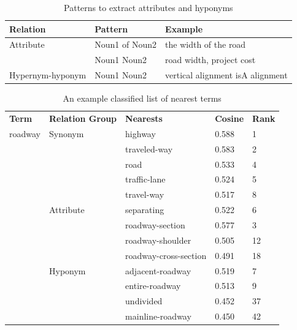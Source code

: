 \documentclass[Journal, BackFigs,NoLists, DoubleSpace]{ascelike}%
\begin{document}
%
\begin{table} [t]
	\caption{Patterns to extract attributes and hyponyms}
	\label{table:attribute_pattern}
	\centering
	\small
	\renewcommand{\arraystretch}{1.25}
	\begin{tabular}{l l l}
		\hline
		\textbf{Relation} & \textbf{Pattern} & \textbf{Example}\\
		\hline
		Attribute &	Noun1 of Noun2 & the width of the road\\
		& Noun1 Noun2	&	road width, project cost\\
		Hypernym-hyponym & Noun1 Noun2 & vertical alignment isA alignment\\
		\hline
	\end{tabular}
	\normalsize
\end{table}
%
\begin{table} [t]
	\caption{An example classified list of nearest terms}
	\label{table:term_clustering}
	\centering
	\small
	\renewcommand{\arraystretch}{1.25}
	\begin{tabular}{l l l l l}
		\hline
		\textbf{Term}	&\textbf{Relation Group}	& \textbf{Nearests} & \textbf{Cosine} & \textbf{Rank}\\
		roadway			&Synonym					& highway & 0.588 & 1\\
		&							& traveled-way & 0.583 & 2\\
		&							& road & 0.533 & 4\\						
		&							& traffic-lane & 0.524 &5\\ 						
		&							& travel-way & 0.517 & 8\\  \cmidrule{2-5}
		&Attribute					& separating & 0.522 &6\\
		&							& roadway-section & 0.577 & 3\\						
		&							& roadway-shoulder & 0.505 & 12\\
		&							& roadway-cross-section & 0.491 & 18\\\cmidrule{2-5}						
		&Hyponym					& adjacent-roadway & 0.519 & 7\\
		&							& entire-roadway & 0.513 & 9\\
		&							& undivided & 0.452 & 37\\
		&							& mainline-roadway & 0.450 & 42\\
		\hline
	\end{tabular}
	\normalsize
\end{table}
\end{document}
